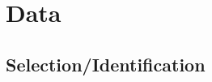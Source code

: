 \documentclass[a4paper,fleqn,usenatbib]{mnras}
\begin{document}
\section{Data}
\subsection{Selection/Identification}
\end{document}
